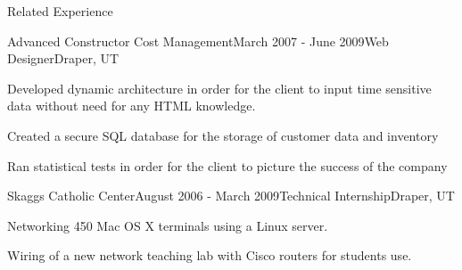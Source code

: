 \documentclass{resume}
\begin{document}
\begin{rSection}{Related Experience}

\begin{experienceACCM}
\begin{rSubsection}{Advanced Constructor Cost Management}{March 2007 - June 2009}{Web Designer}{Draper, UT}
\item Developed dynamic architecture in order for the client to input time sensitive data without need for any HTML knowledge.
\item Created a secure SQL database for the storage of customer data and inventory
\item Ran statistical tests in order for the client to picture the success of the company
\end{rSubsection}
\end{experienceACCM}


\begin{experienceJdIntern}
\begin{rSubsection}{Skaggs Catholic Center}{August 2006 - March 2009}{Technical Internship}{Draper, UT}
\item Networking 450 Mac OS X terminals using a Linux server.
\item Wiring of a new network teaching lab with Cisco routers for students use.
\end{rSubsection}
\end{experienceJdIntern}

\end{rSection}

\end{document}
